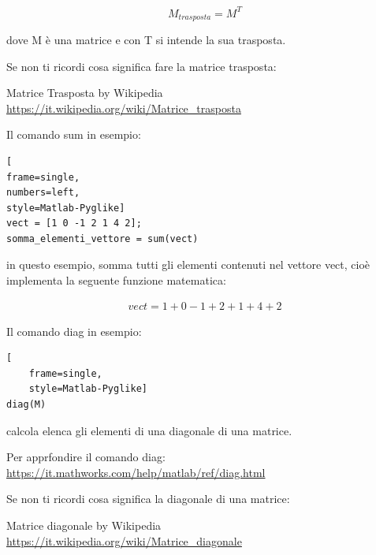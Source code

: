 {
    \Large 
    \begin{equation}
        M_{trasposta} = M^{T}
    \end{equation}
}

dove M è una matrice e con T si intende la sua trasposta. \newline 

\begin{tcolorbox}
    Se non ti ricordi cosa significa fare la matrice trasposta: \newline 

    Matrice Trasposta by Wikipedia \\ 
    \url{https://it.wikipedia.org/wiki/Matrice_trasposta}
\end{tcolorbox} 

Il comando sum in esempio: 

\begin{lstlisting}[
frame=single,
numbers=left,
style=Matlab-Pyglike]
vect = [1 0 -1 2 1 4 2]; 
somma_elementi_vettore = sum(vect)
\end{lstlisting}

in questo esempio, somma tutti gli elementi contenuti nel vettore vect, cioè implementa la seguente funzione matematica: 

{
    \Large 
    \begin{equation}
        \begin{split}
    vect = 1 + 0 -1 +2 +1 +4 + 2        
        \end{split}
    \end{equation}
}

Il comando diag in esempio: 

\begin{lstlisting}[
    frame=single,
    style=Matlab-Pyglike]
diag(M)  
\end{lstlisting}

calcola elenca gli elementi di una diagonale di una matrice. \newline 

\begin{tcolorbox}
    Per apprfondire il comando diag: \url{https://it.mathworks.com/help/matlab/ref/diag.html} \newline 

    Se non ti ricordi cosa significa la diagonale di una matrice: \newline 

    Matrice diagonale by Wikipedia \\  
    \url{https://it.wikipedia.org/wiki/Matrice_diagonale}
\end{tcolorbox}

